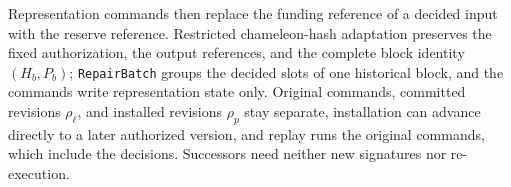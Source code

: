Representation commands then replace the funding reference of a decided input with the reserve reference. Restricted chameleon-hash adaptation preserves the fixed authorization, the output references, and the complete block identity $(H_b,P_b)$; \texttt{RepairBatch} groups the decided slots of one historical block, and the commands write representation state only. Original commands, committed revisions $\rho_\ell$, and installed revisions $\rho_p$ stay separate, installation can advance directly to a later authorized version, and replay runs the original commands, which include the decisions. Successors need neither new signatures nor re-execution.
